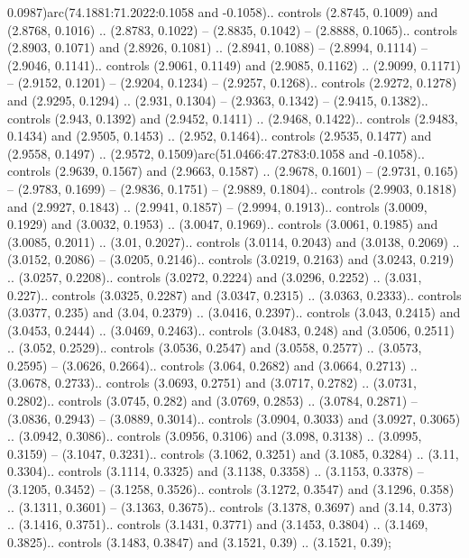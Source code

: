 0.0987)arc(74.1881:71.2022:0.1058 and -0.1058).. controls (2.8745, 0.1009) and (2.8768, 0.1016) .. (2.8783, 0.1022) -- (2.8835, 0.1042) -- (2.8888, 0.1065).. controls (2.8903, 0.1071) and (2.8926, 0.1081) .. (2.8941, 0.1088) -- (2.8994, 0.1114) -- (2.9046, 0.1141).. controls (2.9061, 0.1149) and (2.9085, 0.1162) .. (2.9099, 0.1171) -- (2.9152, 0.1201) -- (2.9204, 0.1234) -- (2.9257, 0.1268).. controls (2.9272, 0.1278) and (2.9295, 0.1294) .. (2.931, 0.1304) -- (2.9363, 0.1342) -- (2.9415, 0.1382).. controls (2.943, 0.1392) and (2.9452, 0.1411) .. (2.9468, 0.1422).. controls (2.9483, 0.1434) and (2.9505, 0.1453) .. (2.952, 0.1464).. controls (2.9535, 0.1477) and (2.9558, 0.1497) .. (2.9572, 0.1509)arc(51.0466:47.2783:0.1058 and -0.1058).. controls (2.9639, 0.1567) and (2.9663, 0.1587) .. (2.9678, 0.1601) -- (2.9731, 0.165) -- (2.9783, 0.1699) -- (2.9836, 0.1751) -- (2.9889, 0.1804).. controls (2.9903, 0.1818) and (2.9927, 0.1843) .. (2.9941, 0.1857) -- (2.9994, 0.1913).. controls (3.0009, 0.1929) and (3.0032, 0.1953) .. (3.0047, 0.1969).. controls (3.0061, 0.1985) and (3.0085, 0.2011) .. (3.01, 0.2027).. controls (3.0114, 0.2043) and (3.0138, 0.2069) .. (3.0152, 0.2086) -- (3.0205, 0.2146).. controls (3.0219, 0.2163) and (3.0243, 0.219) .. (3.0257, 0.2208).. controls (3.0272, 0.2224) and (3.0296, 0.2252) .. (3.031, 0.227).. controls (3.0325, 0.2287) and (3.0347, 0.2315) .. (3.0363, 0.2333).. controls (3.0377, 0.235) and (3.04, 0.2379) .. (3.0416, 0.2397).. controls (3.043, 0.2415) and (3.0453, 0.2444) .. (3.0469, 0.2463).. controls (3.0483, 0.248) and (3.0506, 0.2511) .. (3.052, 0.2529).. controls (3.0536, 0.2547) and (3.0558, 0.2577) .. (3.0573, 0.2595) -- (3.0626, 0.2664).. controls (3.064, 0.2682) and (3.0664, 0.2713) .. (3.0678, 0.2733).. controls (3.0693, 0.2751) and (3.0717, 0.2782) .. (3.0731, 0.2802).. controls (3.0745, 0.282) and (3.0769, 0.2853) .. (3.0784, 0.2871) -- (3.0836, 0.2943) -- (3.0889, 0.3014).. controls (3.0904, 0.3033) and (3.0927, 0.3065) .. (3.0942, 0.3086).. controls (3.0956, 0.3106) and (3.098, 0.3138) .. (3.0995, 0.3159) -- (3.1047, 0.3231).. controls (3.1062, 0.3251) and (3.1085, 0.3284) .. (3.11, 0.3304).. controls (3.1114, 0.3325) and (3.1138, 0.3358) .. (3.1153, 0.3378) -- (3.1205, 0.3452) -- (3.1258, 0.3526).. controls (3.1272, 0.3547) and (3.1296, 0.358) .. (3.1311, 0.3601) -- (3.1363, 0.3675).. controls (3.1378, 0.3697) and (3.14, 0.373) .. (3.1416, 0.3751).. controls (3.1431, 0.3771) and (3.1453, 0.3804) .. (3.1469, 0.3825).. controls (3.1483, 0.3847) and (3.1521, 0.39) .. (3.1521, 0.39);



